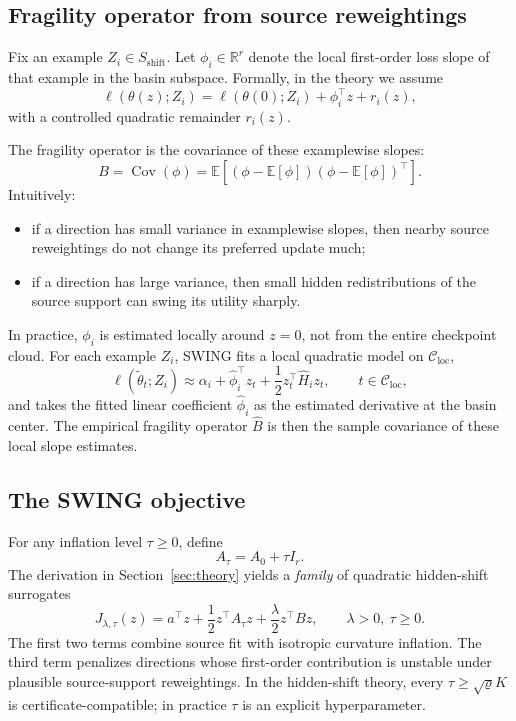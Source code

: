 \documentclass{article}
\newcommand{\RR}{\mathbb{R}}
\newcommand{\EE}{\mathbb{E}}
\newcommand{\cC}{\mathcal{C}}
\newcommand{\Cov}{\operatorname{Cov}}
\newcommand{\loss}{\ell}
\newcommand{\swing}{\textup{\textsc{SWING}}}
\newcommand{\paren}[1]{\left( #1 \right)}
\newcommand{\bracks}[1]{\left[ #1 \right]}
\begin{document}
\subsection{Fragility operator from source reweightings}

Fix an example \(Z_i \in S_{\mathrm{shift}}\). Let \(\phi_i \in \RR^r\) denote the local first-order loss slope of that example in the basin subspace. Formally, in the theory we assume
\[
\loss\paren{\theta(z); Z_i}
=
\loss\paren{\theta(0); Z_i}
+
\phi_i^\top z
+
r_i(z),
\]
with a controlled quadratic remainder \(r_i(z)\).

The fragility operator is the covariance of these examplewise slopes:
\[
B
=
\Cov(\phi)
=
\EE\bracks{(\phi - \EE[\phi])(\phi-\EE[\phi])^\top}.
\]
Intuitively:
\begin{itemize}[leftmargin=1.4em]
    \item if a direction has small variance in examplewise slopes, then nearby source reweightings do not change its preferred update much;
    \item if a direction has large variance, then small hidden redistributions of the source support can swing its utility sharply.
\end{itemize}

In practice, \(\phi_i\) is estimated locally around \(z=0\), not from the entire checkpoint cloud. For each example \(Z_i\), \swing{} fits a local quadratic model on \(\cC_{\mathrm{loc}}\),
\[
\loss(\tilde\theta_t;Z_i)
\approx
\alpha_i + \hat\phi_i^\top z_t + \frac12 z_t^\top \hat H_i z_t,
\qquad t\in\cC_{\mathrm{loc}},
\]
and takes the fitted linear coefficient \(\hat\phi_i\) as the estimated derivative at the basin center. The empirical fragility operator \(\hat B\) is then the sample covariance of these local slope estimates.

\subsection{The \swing{} objective}

For any inflation level \(\tau\ge 0\), define
\[
A_\tau = A_0 + \tau I_r.
\]
The derivation in Section~\ref{sec:theory} yields a \emph{family} of quadratic hidden-shift surrogates
\[
J_{\lambda,\tau}(z)
=
a^\top z + \frac12 z^\top A_\tau z + \frac{\lambda}{2} z^\top B z,
\qquad \lambda > 0,\ \tau\ge 0.
\]
The first two terms combine source fit with isotropic curvature inflation. The third term penalizes directions whose first-order contribution is unstable under plausible source-support reweightings. In the hidden-shift theory, every \(\tau\ge \sqrt{\varrho}K\) is certificate-compatible; in practice \(\tau\) is an explicit hyperparameter.
\end{document}
